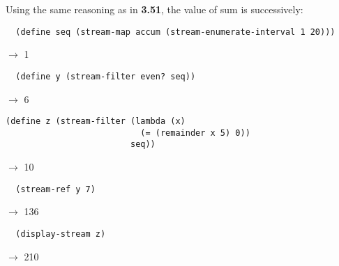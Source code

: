 \documentclass[a4paper,12pt]{article}
\begin{document}
Using the same reasoning as in \textbf{3.51}, the value of sum is
successively:

\begin{lstlisting}
  (define seq (stream-map accum (stream-enumerate-interval 1 20)))
\end{lstlisting}
$\rightarrow$ 1

\begin{lstlisting}
  (define y (stream-filter even? seq))
\end{lstlisting}
$\rightarrow$ 6

\begin{lstlisting}
(define z (stream-filter (lambda (x)
                           (= (remainder x 5) 0))
                         seq))
\end{lstlisting}
$\rightarrow$ 10

\begin{lstlisting}
  (stream-ref y 7)
\end{lstlisting}
$\rightarrow$ 136

\begin{lstlisting}
  (display-stream z)
\end{lstlisting}
$\rightarrow$ 210
\end{document}
